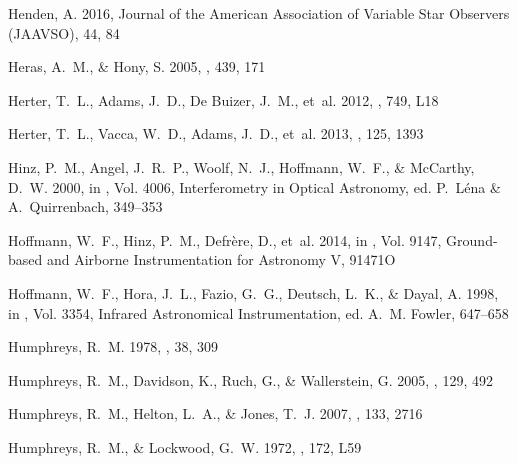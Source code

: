 \documentclass[modern]{aastex61}
\begin{document}
\begin{thebibliography}{}
{Henden}, A. 2016, Journal of the American Association of Variable Star
  Observers (JAAVSO), 44, 84

{Heras}, A.~M., \& {Hony}, S. 2005, \aap, 439, 171

{Herter}, T.~L., {Adams}, J.~D., {De Buizer}, J.~M., {et~al.} 2012, \apjl, 749,
  L18

{Herter}, T.~L., {Vacca}, W.~D., {Adams}, J.~D., {et~al.} 2013, \pasp, 125,
  1393

{Hinz}, P.~M., {Angel}, J.~R.~P., {Woolf}, N.~J., {Hoffmann}, W.~F., \&
  {McCarthy}, D.~W. 2000, in \procspie, Vol. 4006, Interferometry in Optical
  Astronomy, ed. P.~{L{\'e}na} \& A.~{Quirrenbach}, 349--353

{Hoffmann}, W.~F., {Hinz}, P.~M., {Defr{\`e}re}, D., {et~al.} 2014, in
  \procspie, Vol. 9147, Ground-based and Airborne Instrumentation for Astronomy
  V, 91471O

{Hoffmann}, W.~F., {Hora}, J.~L., {Fazio}, G.~G., {Deutsch}, L.~K., \& {Dayal},
  A. 1998, in \procspie, Vol. 3354, Infrared Astronomical Instrumentation, ed.
  A.~M. {Fowler}, 647--658

{Humphreys}, R.~M. 1978, \apjs, 38, 309

{Humphreys}, R.~M., {Davidson}, K., {Ruch}, G., \& {Wallerstein}, G. 2005, \aj,
  129, 492

{Humphreys}, R.~M., {Helton}, L.~A., \& {Jones}, T.~J. 2007, \aj, 133, 2716

{Humphreys}, R.~M., \& {Lockwood}, G.~W. 1972, \apjl, 172, L59


\end{thebibliography}
\end{document}
